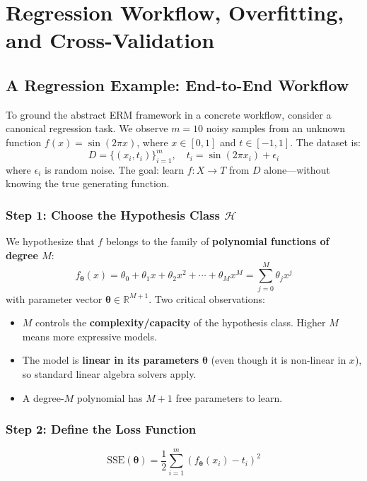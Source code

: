 \chapter*{Regression Workflow, Overfitting, and Cross-Validation}

\section*{A Regression Example: End-to-End Workflow}

To ground the abstract ERM framework in a concrete workflow, consider a canonical regression task. We observe $m = 10$ noisy samples from an unknown function $f(x) = \sin(2\pi x)$, where $x \in [0,1]$ and $t \in [-1,1]$. The dataset is:
$$D = \{(x_i, t_i)\}_{i=1}^{m}, \quad t_i = \sin(2\pi x_i) + \epsilon_i$$
where $\epsilon_i$ is random noise. The goal: learn $f: X \to T$ from $D$ alone---without knowing the true generating function.

\subsection*{Step 1: Choose the Hypothesis Class $\mathcal{H}$}

We hypothesize that $f$ belongs to the family of \textbf{polynomial functions of degree $M$}:
$$f_{\boldsymbol{\theta}}(x) = \theta_0 + \theta_1 x + \theta_2 x^2 + \cdots + \theta_M x^M = \sum_{j=0}^{M} \theta_j x^j$$
with parameter vector $\boldsymbol{\theta} \in \mathbb{R}^{M+1}$. Two critical observations:
\begin{itemize}
    \item $M$ controls the \textbf{complexity/capacity} of the hypothesis class. Higher $M$ means more expressive models.
    \item The model is \textbf{linear in its parameters} $\boldsymbol{\theta}$ (even though it is non-linear in $x$), so standard linear algebra solvers apply.
    \item A degree-$M$ polynomial has $M+1$ free parameters to learn.
\end{itemize}

\subsection*{Step 2: Define the Loss Function}

\begin{definition}
$$\text{SSE}(\boldsymbol{\theta}) = \frac{1}{2} \sum_{i=1}^{m} \left( f_{\boldsymbol{\theta}}(x_i) - t_i \right)^2$$
\end{definition}


